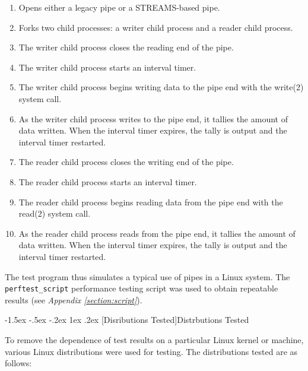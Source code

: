 \documentclass[letterpaper,final,notitlepage,twocolumn,10pt,twoside]{article}
\makeatletter
\renewcommand\subsection{\@startsection{subsection}{2}{\z@}%
                                     {-1.5ex \@plus -.5ex \@minus -.2ex}%
                                     {1ex \@plus .2ex}%
                                     {\normalfont\normalsize\bfseries}}
\makeatother
\begin{document}
\begin{enumerate}

\item Opens either a legacy pipe or a STREAMS-based pipe.

\item Forks two child processes: a writer child process and a reader child
process.

\item The writer child process closes the reading end of the pipe.

\item The writer child process starts an interval timer.

\item The writer child process begins writing data to the pipe end with the
write(2) system call.

\item As the writer child process writes to the pipe end, it tallies the
amount of data written.  When the interval timer expires, the tally is output
and the interval timer restarted.

\item The reader child process closes the writing end of the pipe.

\item The reader child process starts an interval timer.

\item The reader child process begins reading data from the pipe end with the
read(2) system call.

\item As the reader child process reads from the pipe end, it tallies the
amount of data written.  When the interval timer expires, the tally is output
and the interval timer restarted.

\end{enumerate}

The test program thus simulates a typical use of pipes in a Linux system.  The
\texttt{perftest\_script} performance testing script was used to obtain
repeatable results (see \textit{Appendix \ref{section:script}}).

\subsection[Disributions Tested]{Distrbutions Tested}

To remove the dependence of test results on a particular Linux kernel or
machine, various Linux distributions were used for testing.  The distributions
tested are as follows:
\end{document}
